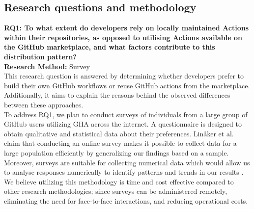 \documentclass[conference]{IEEEtran}
\begin{document}
    \subsection{Research questions and methodology}


        \textbf{RQ1: To what extent do developers rely on locally maintained Actions within their repositories, as opposed to utilising Actions available on the GitHub marketplace, and what factors contribute to this distribution pattern?}\\

        \textbf{Research Method:} Survey\\
            
        This research question is answered by determining whether developers prefer to build their own GitHub workflows or reuse GitHub actions from the marketplace. Additionally, it aims to explain the reasons behind the observed differences between these approaches.\\

        To address RQ1, we plan to conduct surveys of individuals from a large group of GitHub users utilizing GHA across the internet. A questionnaire is designed to obtain qualitative and statistical data about their preferences. Linåker et al. \cite{linaker2013guidelines} claim that conducting an online survey makes it possible to collect data for a large population efficiently by generalizing our findings based on a sample. Moreover, surveys are suitable for collecting numerical data which would allow us to analyse responses numerically to identify patterns and trends in our results \cite{fowler2009survey}. We believe utilizing this methodology is time and cost effective compared to other research methodologies; since surveys can be administered remotely, eliminating the need for face-to-face interactions, and reducing operational costs.\\
\end{document}
